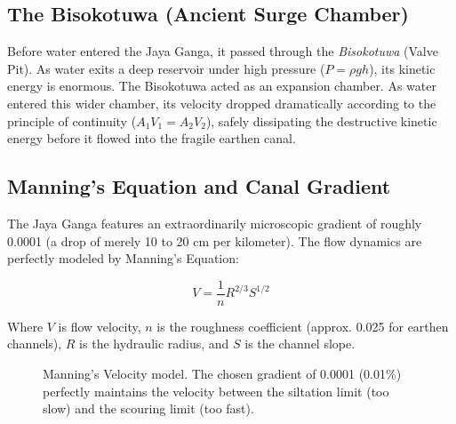 \documentclass[12pt,a4paper]{report}
\begin{document}
	\subsection{The Bisokotuwa (Ancient Surge Chamber)}
	Before water entered the Jaya Ganga, it passed through the \textit{Bisokotuwa} (Valve Pit). As water exits a deep reservoir under high pressure ($P = \rho g h$), its kinetic energy is enormous. The Bisokotuwa acted as an expansion chamber. As water entered this wider chamber, its velocity dropped dramatically according to the principle of continuity ($A_1V_1 = A_2V_2$), safely dissipating the destructive kinetic energy before it flowed into the fragile earthen canal.
	
	\subsection{Manning's Equation and Canal Gradient}
	The Jaya Ganga features an extraordinarily microscopic gradient of roughly 0.0001 (a drop of merely 10 to 20 cm per kilometer). The flow dynamics are perfectly modeled by Manning's Equation:
	
	\begin{equation}
		V = \frac{1}{n} R^{2/3} S^{1/2}
	\end{equation}
	
	Where $V$ is flow velocity, $n$ is the roughness coefficient (approx. 0.025 for earthen channels), $R$ is the hydraulic radius, and $S$ is the channel slope. 
	
	\begin{figure}[H]
		\centering
		\caption{Manning's Velocity model. The chosen gradient of 0.0001 (0.01\%) perfectly maintains the velocity between the siltation limit (too slow) and the scouring limit (too fast).}
		\label{fig:manning_velocity}
	\end{figure}
	
\end{document}
